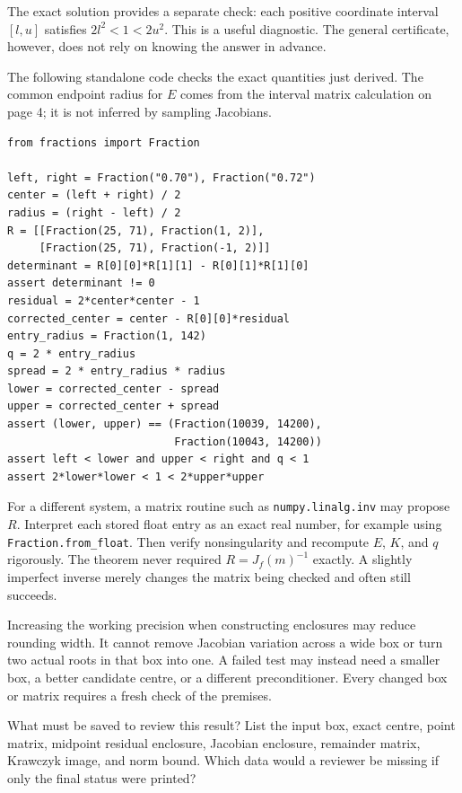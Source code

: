 The exact solution provides a separate check: each positive coordinate
interval $[l,u]$ satisfies $2l^2<1<2u^2$. This is a useful diagnostic.
The general certificate, however, does not rely on knowing the answer in advance.

\newpage
{}
The following standalone code checks the exact quantities just derived.
The common endpoint radius for $E$ comes from the interval matrix
calculation on page 4; it is not inferred by sampling Jacobians.
\begin{lstlisting}
from fractions import Fraction

left, right = Fraction("0.70"), Fraction("0.72")
center = (left + right) / 2
radius = (right - left) / 2
R = [[Fraction(25, 71), Fraction(1, 2)],
     [Fraction(25, 71), Fraction(-1, 2)]]
determinant = R[0][0]*R[1][1] - R[0][1]*R[1][0]
assert determinant != 0
residual = 2*center*center - 1
corrected_center = center - R[0][0]*residual
entry_radius = Fraction(1, 142)
q = 2 * entry_radius
spread = 2 * entry_radius * radius
lower = corrected_center - spread
upper = corrected_center + spread
assert (lower, upper) == (Fraction(10039, 14200),
                          Fraction(10043, 14200))
assert left < lower and upper < right and q < 1
assert 2*lower*lower < 1 < 2*upper*upper
\end{lstlisting}

For a different system, a matrix routine such as \texttt{numpy.linalg.inv}
may propose $R$. Interpret each stored float entry as an exact real number,
for example using \texttt{Fraction.from\_float}. Then verify nonsingularity
and recompute $E$, $K$, and $q$ rigorously. The theorem never required
$R=J_f(m)^{-1}$ exactly. A slightly imperfect inverse merely changes the
matrix being checked and often still succeeds.

Increasing the working precision when constructing enclosures may reduce
rounding width. It cannot remove Jacobian variation across a wide box or
turn two actual roots in that box into one. A failed test may instead need
a smaller box, a better candidate centre, or a different preconditioner.
Every changed box or matrix requires a fresh check of the premises.

\begin{question}{What must be saved to review this result?}
List the input box, exact centre, point matrix, midpoint residual enclosure,
Jacobian enclosure, remainder matrix, Krawczyk image, and norm bound.
Which data would a reviewer be missing if only the final status were printed?
\end{question}

